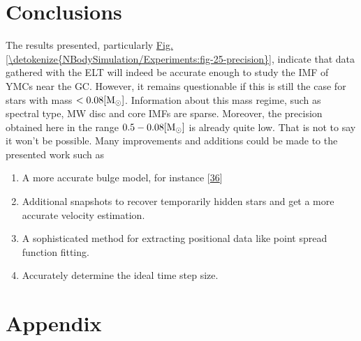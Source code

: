\documentclass[letterpaper,10pt,english]{sphinxmanual}
\begin{document}
\chapter{Conclusions}
\label{\detokenize{NBodySimulation/Conclusions:conclusions}}\label{\detokenize{NBodySimulation/Conclusions::doc}}
\sphinxAtStartPar
The results presented, particularly \hyperref[\detokenize{NBodySimulation/Experiments:fig-25-precision}]{Fig.\@ \ref{\detokenize{NBodySimulation/Experiments:fig-25-precision}}}, indicate that data gathered with the ELT will indeed be accurate enough to study the IMF of YMCs near the GC.
However, it remains questionable if this is still the case for stars with mass \(< 0.08 [\textup{M}_\odot]\).
Information about this mass regime, such as spectral type, MW disc and core IMFs are sparse.
Moreover, the precision obtained here in the range \(0.5 - 0.08 [\textup{M}_{\odot}]\) is already quite low.
That is not to say it won’t be possible. Many improvements and additions could be made to the presented work such as
\begin{enumerate}
%
\item {} 
\sphinxAtStartPar
A more accurate bulge model, for instance {[}\hyperlink{cite.NBodySimulation/Appendix:id57}{36}{]}

\item {} 
\sphinxAtStartPar
Additional snapshots to recover temporarily hidden stars and get a more accurate velocity estimation.

\item {} 
\sphinxAtStartPar
A sophisticated method for extracting positional data like point spread function fitting.

\item {} 
\sphinxAtStartPar
Accurately determine the ideal time step size.

\end{enumerate}


\chapter{Appendix}
\label{\detokenize{NBodySimulation/Appendix:appendix}}\label{\detokenize{NBodySimulation/Appendix:appendix-label}}\label{\detokenize{NBodySimulation/Appendix::doc}}
\end{document}
